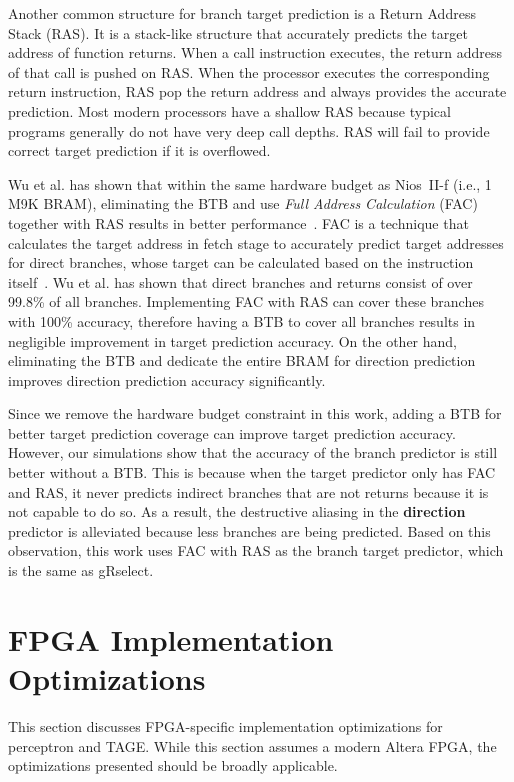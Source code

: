 \documentclass[conference]{IEEEtran}
\begin{document}
Another common structure for branch target prediction is a Return Address Stack (RAS). It is a stack-like structure that accurately predicts the target address of function returns. When a call instruction executes, the return address of that call is pushed on RAS. When the processor executes the corresponding return instruction, RAS pop the return address and always provides the accurate prediction. Most modern processors have a shallow RAS because typical programs generally do not have very deep call depths. RAS will fail to provide correct target prediction if it is overflowed.

Wu et al. has shown that within the same hardware budget as Nios~II-f (i.e., 1 M9K BRAM), eliminating the BTB and use \textit{Full Address Calculation} (FAC) together with RAS results in better performance~\cite{grselect}. FAC is a technique that calculates the target address in fetch stage to accurately predict target addresses for direct branches, whose target can be calculated based on the instruction itself~\cite{niosii}. Wu et al. has shown that direct branches and returns consist of over 99.8\% of all branches. Implementing FAC with RAS can cover these branches with 100\% accuracy, therefore having a BTB to cover all branches results in negligible improvement in target prediction accuracy. On the other hand, eliminating the BTB and dedicate the entire BRAM for direction prediction improves direction prediction accuracy significantly.

Since we remove the hardware budget constraint in this work, adding a BTB for better target prediction coverage can improve target prediction accuracy. However, our simulations show that the accuracy of the branch predictor is still better without a BTB. This is because when the target predictor only has FAC and RAS, it never predicts indirect branches that are not returns because it is not capable to do so. As a result, the destructive aliasing in the \textbf{direction} predictor is alleviated because less branches are being predicted. Based on this observation, this work uses FAC with RAS as the branch target predictor, which is the same as gRselect.


\section{FPGA Implementation Optimizations}
\label{sec:fpga}
This section discusses FPGA-specific implementation optimizations for perceptron and TAGE. While this section assumes a modern Altera FPGA, the optimizations presented should be broadly applicable.
\end{document}
